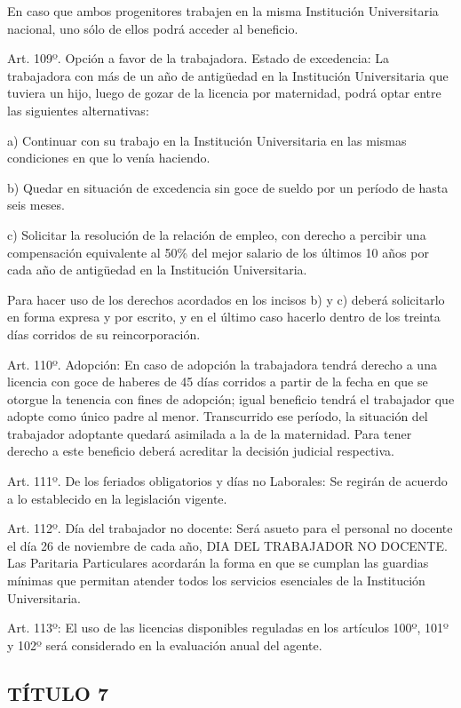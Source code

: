 \documentclass[]{article}
\begin{document}
En caso que ambos progenitores trabajen en la misma Institución
Universitaria nacional, uno sólo de ellos podrá acceder al beneficio.

Art. 109º. Opción a favor de la trabajadora. Estado de excedencia: La
trabajadora con más de un año de antigüedad en la Institución
Universitaria que tuviera un hijo, luego de gozar de la licencia por
maternidad, podrá optar entre las siguientes alternativas:

a) Continuar con su trabajo en la Institución Universitaria en las
mismas condiciones en que lo venía haciendo.

b) Quedar en situación de excedencia sin goce de sueldo por un período
de hasta seis meses.

c) Solicitar la resolución de la relación de empleo, con derecho a
percibir una compensación equivalente al 50\% del mejor salario de los
últimos 10 años por cada año de antigüedad en la Institución
Universitaria.

Para hacer uso de los derechos acordados en los incisos b) y c) deberá
solicitarlo en forma expresa y por escrito, y en el último caso hacerlo
dentro de los treinta días corridos de su reincorporación.

Art. 110º. Adopción: En caso de adopción la trabajadora tendrá derecho a
una licencia con goce de haberes de 45 días corridos a partir de la
fecha en que se otorgue la tenencia con fines de adopción; igual
beneficio tendrá el trabajador que adopte como único padre al menor.
Transcurrido ese período, la situación del trabajador adoptante quedará
asimilada a la de la maternidad. Para tener derecho a este beneficio
deberá acreditar la decisión judicial respectiva.

Art. 111º. De los feriados obligatorios y días no Laborales: Se regirán
de acuerdo a lo establecido en la legislación vigente.

Art. 112º. Día del trabajador no docente: Será asueto para el personal
no docente el día 26 de noviembre de cada año, DIA DEL TRABAJADOR NO
DOCENTE. Las Paritaria Particulares acordarán la forma en que se cumplan
las guardias mínimas que permitan atender todos los servicios esenciales
de la Institución Universitaria.

Art. 113º: El uso de las licencias disponibles reguladas en los
artículos 100º, 101º y 102º será considerado en la evaluación anual del
agente.

\subsection{TÍTULO 7}\label{tuxedtulo-7}
\end{document}
